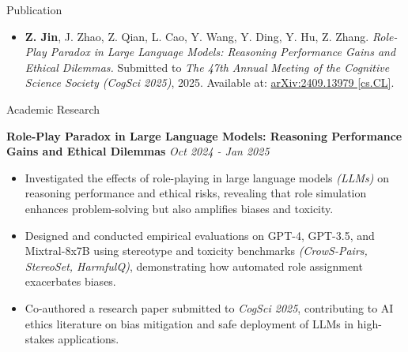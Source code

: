 \documentclass{resume} %
\begin{document}
\begin{rSection}{Publication}

\begin{itemize}
    \item \textbf{Z. Jin}, J. Zhao, Z. Qian, L. Cao, Y. Wang, Y. Ding, Y. Hu, Z. Zhang.
    \textit{Role-Play Paradox in Large Language Models: Reasoning Performance Gains and Ethical Dilemmas.}  
    Submitted to \textit{The 47th Annual Meeting of the Cognitive Science Society (CogSci 2025)}, 2025.  
    Available at: \href{https://doi.org/10.48550/arXiv.2409.13979}{arXiv:2409.13979 [cs.CL]}.
\end{itemize}

\end{rSection}

\begin{rSection}{Academic Research}

{\bf Role-Play Paradox in Large Language Models: Reasoning Performance Gains and Ethical Dilemmas} \hfill {\em Oct 2024 - Jan 2025}  
\begin{itemize}
    \vspace{-0.2cm} \item Investigated the effects of role-playing in large language models \textit{(LLMs)} on reasoning performance and ethical risks, revealing that role simulation enhances problem-solving but also amplifies biases and toxicity.  
    \vspace{-0.2cm}\item Designed and conducted empirical evaluations on GPT-4, GPT-3.5, and Mixtral-8x7B using stereotype and toxicity benchmarks \textit{(CrowS-Pairs, StereoSet, HarmfulQ)}, demonstrating how automated role assignment exacerbates biases.  
    \vspace{-0.2cm}\item Co-authored a research paper submitted to \textit{CogSci 2025}, contributing to AI ethics literature on bias mitigation and safe deployment of LLMs in high-stakes applications.  
\end{itemize}

\end{rSection}
\end{document}
